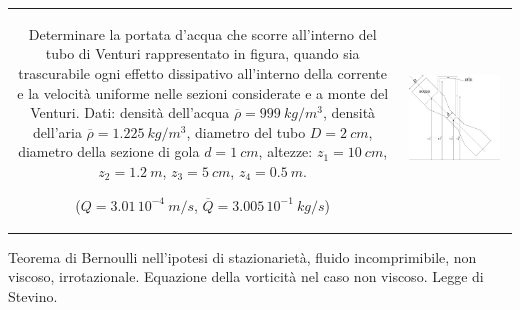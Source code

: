 \noindent
\begin{tabular}{cc}
\begin{minipage}[b]{0.60\textwidth}
\begin{exerciseS}
Determinare la portata d'acqua che scorre all'interno del tubo di Venturi 
rappresentato in figura, quando sia trascurabile ogni effetto dissipativo 
all'interno della corrente e la velocit\`{a} uniforme nelle sezioni considerate e
a monte del Venturi.
Dati: densit\`{a} dell'acqua $\overline{\rho}= 999\ kg/m^3$, 
densit\`{a} dell'aria $\overline{\rho}= 1.225\ kg/m^3$,
diametro del tubo $D=2\ cm$, diametro della sezione di gola
$d=1\ cm $, altezze: $z_1 = 10\ cm $, $z_2 = 1.2\ m $,
$z_3 = 5\ cm $, $z_4 = 0.5\ m $.

($Q=3.01\, 10^{-4}\ m/s$, $\overline{Q}=3.005\, 10^{-1}\ kg/s$)
\end{exerciseS}
\end{minipage}
&
\begin{minipage}{0.35\textwidth}
   \begin{center}
   \includegraphics[width=0.90\textwidth]{./fig/venturi.eps}
   \end{center}
\end{minipage}
\end{tabular}

\sol

\partone
Teorema di Bernoulli nell'ipotesi di stazionarietà, fluido incomprimibile, non viscoso, irrotazionale.
Equazione della vorticità nel caso non viscoso.
Legge di Stevino.

